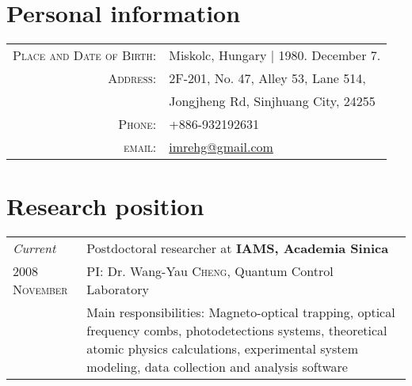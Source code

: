 \documentclass[10pt]{article}
\begin{document}
\par{}

\section*{Personal information}

\begin{tabular}{rl}
    \textsc{Place and Date of Birth:} & Miskolc, Hungary | 1980. December 7. \\
    \textsc{Address:}   & 2F-201, No. 47, Alley 53, Lane 514, \\
                        & Jongjheng Rd, Sinjhuang City, 24255 \\
    \textsc{Phone:}     & +886-932192631 \\
    \textsc{email:}     & \href{mailto:imrehg@gmail.com}{imrehg@gmail.com}
\end{tabular}

\section*{Research position}
\begin{tabular}{p{3cm}|p{11cm}}
 \emph{Current} & Postdoctoral researcher at \textbf{IAMS, Academia Sinica}\\
\textsc{2008 November}& \small{PI: Dr. Wang-Yau \textsc{Cheng}, Quantum Control Laboratory}\\
&\footnotesize{Main responsibilities: Magneto-optical trapping, optical frequency combs, photodetections systems, theoretical atomic physics calculations, experimental system modeling, data collection and analysis software}
\end{tabular}

\end{document}
